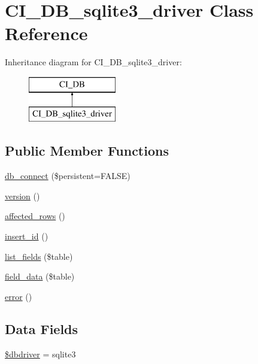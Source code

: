 \hypertarget{class_c_i___d_b__sqlite3__driver}{}\section{C\+I\+\_\+\+D\+B\+\_\+sqlite3\+\_\+driver Class Reference}
\label{class_c_i___d_b__sqlite3__driver}
Inheritance diagram for C\+I\+\_\+\+D\+B\+\_\+sqlite3\+\_\+driver\+:\begin{figure}[H]
\begin{center}
\leavevmode
\includegraphics[height=2.000000cm]{class_c_i___d_b__sqlite3__driver}
\end{center}
\end{figure}
\subsection*{Public Member Functions}
\begin{DoxyCompactItemize}
\item 
\mbox{\hyperlink{class_c_i___d_b__sqlite3__driver_a52bf595e79e96cc0a7c907a9b45aeb4d}{db\+\_\+connect}} (\$persistent=F\+A\+L\+SE)
\item 
\mbox{\hyperlink{class_c_i___d_b__sqlite3__driver_a6080dae0886626b9a4cedb29240708b1}{version}} ()
\item 
\mbox{\hyperlink{class_c_i___d_b__sqlite3__driver_a77248aaad33eb132c04cc4aa3f4bc8cb}{affected\+\_\+rows}} ()
\item 
\mbox{\hyperlink{class_c_i___d_b__sqlite3__driver_a933f2cde8dc7f87875e257d0a4902e99}{insert\+\_\+id}} ()
\item 
\mbox{\hyperlink{class_c_i___d_b__sqlite3__driver_aef08cd376b16b24608100ca0e3f2f85b}{list\+\_\+fields}} (\$table)
\item 
\mbox{\hyperlink{class_c_i___d_b__sqlite3__driver_a90355121e1ed009e0efdbd544ab56efa}{field\+\_\+data}} (\$table)
\item 
\mbox{\hyperlink{class_c_i___d_b__sqlite3__driver_a43b8d30b879d4f09ceb059b02af2bc02}{error}} ()
\end{DoxyCompactItemize}
\subsection*{Data Fields}
\begin{DoxyCompactItemize}
\item 
\mbox{\hyperlink{class_c_i___d_b__sqlite3__driver_a0cde2a16322a023d040aa7f725877597}{\$dbdriver}} = \textquotesingle{}sqlite3\textquotesingle{}
\end{DoxyCompactItemize}
